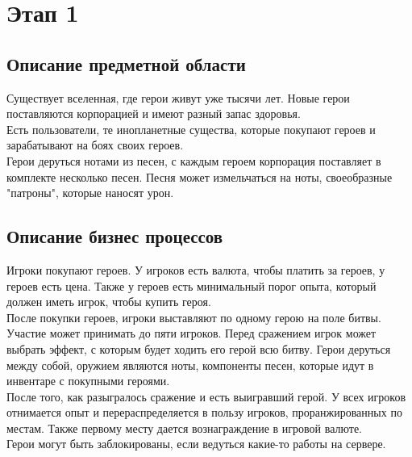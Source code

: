 \section*{Этап 1}


\subsection*{Описание предметной области}

Существует вселенная, где герои живут уже тысячи лет. Новые герои поставляются корпорацией и имеют разный запас здоровья.\\

Есть пользователи, те инопланетные существа, которые покупают героев и зарабатывают на боях своих героев.\\

Герои деруться нотами из песен, с каждым героем корпорация поставляет в комплекте несколько песен. Песня может измельчаться на ноты, своеобразные "патроны", которые наносят урон.


\subsection*{Описание бизнес процессов}


Игроки покупают героев. У игроков есть валюта, чтобы платить за героев, у героев есть цена. Также у героев есть минимальный порог опыта, который должен иметь игрок, чтобы купить героя.\\

После покупки героев, игроки выставляют по одному герою на поле битвы. Участие может принимать до пяти игроков. Перед сражением игрок может выбрать эффект, с которым будет ходить его герой всю битву. Герои деруться между собой, оружием являются ноты, компоненты песен, которые идут в инвентаре с покупными героями.\\

После того, как разыгралось сражение и есть выигравший герой. У всех игроков отнимается опыт и перераспределяется в пользу игроков, проранжированных по местам. Также первому месту дается вознаграждение в игровой валюте. \\

Герои могут быть заблокированы, если ведуться какие-то работы на сервере.

